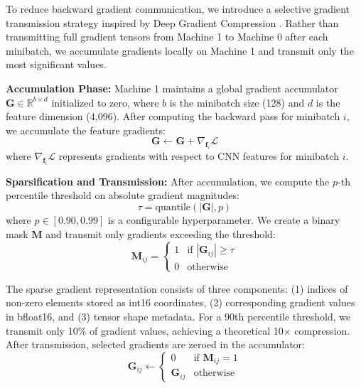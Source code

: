 \documentclass[conference]{IEEEtran}
\begin{document}
To reduce backward gradient communication, we introduce a selective gradient transmission strategy inspired by Deep Gradient Compression \cite{dgc2018}. Rather than transmitting full gradient tensors from Machine 1 to Machine 0 after each minibatch, we accumulate gradients locally on Machine 1 and transmit only the most significant values.

\textbf{Accumulation Phase:} Machine 1 maintains a global gradient accumulator $\mathbf{G} \in \mathbb{R}^{b \times d}$ initialized to zero, where $b$ is the minibatch size (128) and $d$ is the feature dimension (4,096). After computing the backward pass for minibatch $i$, we accumulate the feature gradients:
\begin{equation}
\mathbf{G} \leftarrow \mathbf{G} + \nabla_{\mathbf{f}_i} \mathcal{L}
\end{equation}
where $\nabla_{\mathbf{f}_i} \mathcal{L}$ represents gradients with respect to CNN features for minibatch $i$.

\textbf{Sparsification and Transmission:} After accumulation, we compute the $p$-th percentile threshold on absolute gradient magnitudes:
\begin{equation}
\tau = \text{quantile}(|\mathbf{G}|, p)
\end{equation}
where $p \in [0.90, 0.99]$ is a configurable hyperparameter. We create a binary mask $\mathbf{M}$ and transmit only gradients exceeding the threshold:
\begin{equation}
\mathbf{M}_{ij} = \begin{cases}
1 & \text{if } |\mathbf{G}_{ij}| \geq \tau \\
0 & \text{otherwise}
\end{cases}
\end{equation}

The sparse gradient representation consists of three components: (1) indices of non-zero elements stored as int16 coordinates, (2) corresponding gradient values in bfloat16, and (3) tensor shape metadata. For a 90th percentile threshold, we transmit only 10\% of gradient values, achieving a theoretical 10$\times$ compression. After transmission, selected gradients are zeroed in the accumulator:
\begin{equation}
\mathbf{G}_{ij} \leftarrow \begin{cases}
0 & \text{if } \mathbf{M}_{ij} = 1 \\
\mathbf{G}_{ij} & \text{otherwise}
\end{cases}
\end{equation}
\end{document}
